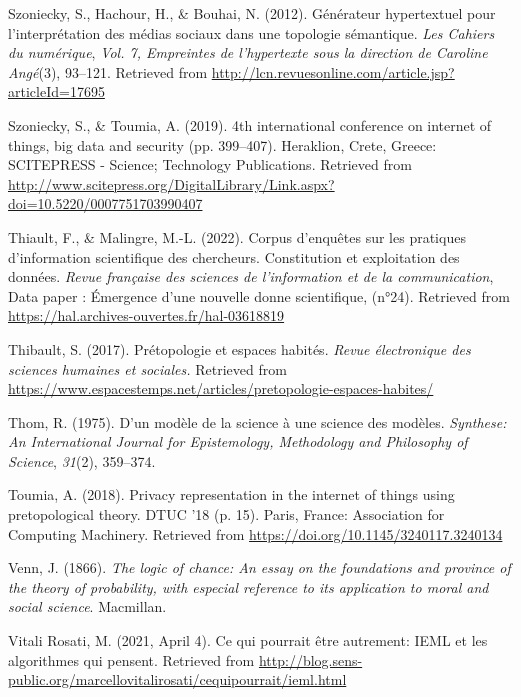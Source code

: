 \documentclass[
  a4paper,
  DIV=11,
  numbers=noendperiod]{scrreprt}
\newlength{\cslhangindent}
\newenvironment{CSLReferences}[2] %
 {\begin{list}{}{%
  \setlength{\itemindent}{0pt}
  \setlength{\leftmargin}{0pt}
  \setlength{\parsep}{0pt}
  \ifodd #1
   \setlength{\leftmargin}{\cslhangindent}
   \setlength{\itemindent}{-1\cslhangindent}
  \fi
  \setlength{\itemsep}{#2\baselineskip}}}
 {\end{list}}
\begin{document}
\begin{CSLReferences}{1}{0}
Szoniecky, S., Hachour, H., \& Bouhai, N. (2012). Générateur
hypertextuel pour l'interprétation des médias sociaux dans une topologie
sémantique. \emph{Les Cahiers du numérique}, \emph{Vol. 7, Empreintes de
l{'}hypertexte sous la direction de Caroline Angé}(3), 93--121.
Retrieved from
\url{http://lcn.revuesonline.com/article.jsp?articleId=17695}

Szoniecky, S., \& Toumia, A. (2019). 4th international conference on
internet of things, big data and security (pp. 399--407). Heraklion,
Crete, Greece: SCITEPRESS - Science; Technology Publications. Retrieved
from
\url{http://www.scitepress.org/DigitalLibrary/Link.aspx?doi=10.5220/0007751703990407}

Thiault, F., \& Malingre, M.-L. (2022). Corpus d'enquêtes sur les
pratiques d'information scientifique des chercheurs. Constitution et
exploitation des données. \emph{Revue française des sciences de
l'information et de la communication}, Data paper : Émergence d'une
nouvelle donne scientifique, (n°24). Retrieved from
\url{https://hal.archives-ouvertes.fr/hal-03618819}

Thibault, S. (2017). Prétopologie et espaces habités. \emph{Revue
électronique des sciences humaines et sociales.} Retrieved from
\url{https://www.espacestemps.net/articles/pretopologie-espaces-habites/}

Thom, R. (1975). D'un modèle de la science à une science des modèles.
\emph{Synthese: An International Journal for Epistemology, Methodology
and Philosophy of Science}, \emph{31}(2), 359--374.

Toumia, A. (2018). Privacy representation in the internet of things
using pretopological theory. DTUC '18 (p. 15). Paris, France:
Association for Computing Machinery. Retrieved from
\url{https://doi.org/10.1145/3240117.3240134}

Venn, J. (1866). \emph{The logic of chance: An essay on the foundations
and province of the theory of probability, with especial reference to
its application to moral and social science}. Macmillan.

Vitali Rosati, M. (2021, April 4). Ce qui pourrait être autrement: IEML
et les algorithmes qui pensent. Retrieved from
\url{http://blog.sens-public.org/marcellovitalirosati/cequipourrait/ieml.html}


\end{CSLReferences}
\end{document}
